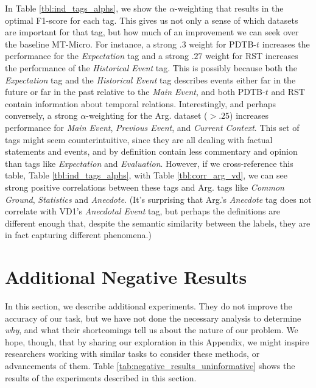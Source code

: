 \documentclass[11pt]{article}
\newcommand\nd{VD1\xspace}
\newcommand\argumentation{Arg.\xspace}
\begin{document}
In Table \ref{tbl:ind_tags_alphs}, we show the $\alpha$-weighting that results in the optimal F1-score for each tag. This gives us not only a sense of which datasets are important for that tag, but how much of an improvement we can seek over the baseline MT-Micro. For instance, a strong $.3$ weight for PDTB-$t$ increases the performance for the \textit{Expectation} tag and a strong $.27$ weight for RST increases the performance of the \textit{Historical Event} tag. This is possibly because both the \textit{Expectation} tag and the \textit{Historical Event} tag describes events either far in the future or far in the past relative to the \textit{Main Event}, and both PDTB-$t$ and RST contain information about temporal relations. Interestingly, and perhaps conversely, a strong $\alpha$-weighting for the \argumentation dataset ($>.25$) increases performance for \textit{Main Event}, \textit{Previous Event}, and \textit{Current Context}. This set of tags might seem counterintuitive, since they are all dealing with factual statements and events, and by definition contain less commentary and opinion than tags like \textit{Expectation} and \textit{Evaluation}. However, if we cross-reference this table, Table \ref{tbl:ind_tags_alphs}, with Table \ref{tbl:corr_arg_vd}, we can see strong positive correlations between these tags and \argumentation tags like \textit{Common Ground}, \textit{Statistics} and \textit{Anecdote}. (It's surprising that \argumentation's \textit{Anecdote} tag does not correlate with \nd's \textit{Anecdotal Event} tag, but perhaps the definitions are different enough that, despite the semantic similarity between the labels, they are in fact capturing different phenomena.)



\section{Additional Negative Results}
\label{app:neg_results}
In this section, we describe additional experiments. %
They do not improve the accuracy of our task, but we have not done the necessary analysis to determine \textit{why}, and what their shortcomings tell us about the nature of our problem. We hope, though, that by sharing our exploration in this Appendix, we might inspire researchers working with similar tasks to consider these methods, or advancements of them. Table \ref{tab:negative_results_uninformative} shows the results of the experiments described in this section.
 
\end{document}
